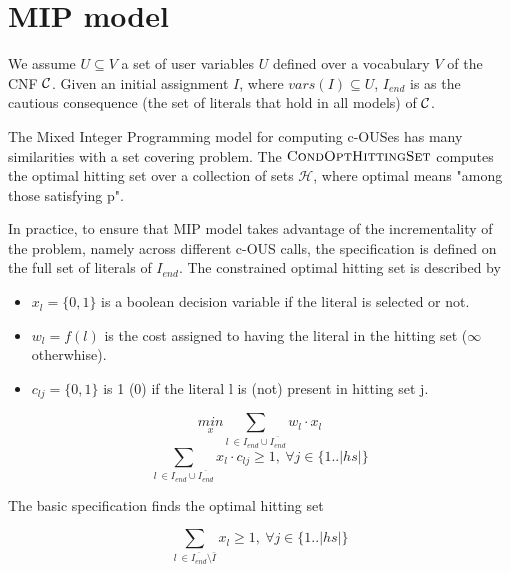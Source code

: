 \documentclass{article}
\newcommand\m[1]{\mathcal{#1}}
\newcommand\setstohit{\ensuremath{\m{H} }\xspace}
\newcommand\Iend{\ensuremath{I_\mathit{end} }\xspace}
\newcommand\mm[1]{\ensuremath{#1}\xspace}
\newcommand\call[1]{\mm{\textsc{#1}}}
\newcommand\cohs{\mm{\call{CondOptHittingSet}}}
\begin{document}
\section{MIP model}

We assume $U \subseteq V$ a set of user variables $U$ defined over a vocabulary $V$ of the CNF ${\cal C}$. Given an initial assignment $I$, where $vars(I) \subseteq U$, $I_{end}$ is as the cautious consequence (the set of literals that hold in all models) of ${\cal C}$.


The Mixed Integer Programming model for computing c-OUSes has many similarities with a set covering problem. The \cohs computes the optimal hitting set over a collection of sets $\setstohit$, where optimal means "among those satisfying p".

In practice, to ensure that MIP model takes advantage of the incrementality of the problem, namely across different c-OUS calls, the specification is defined on the full set of literals of $\Iend$.
The constrained optimal hitting set is described by
\begin{itemize}
  \item $x_l = \{0, 1\} $ is a boolean decision variable if the literal is selected or not.
  \item $w_l = f(l)$ is the cost assigned to having the literal in the hitting set ($\infty$ otherwhise).
  \item $c_{lj} = \{0, 1\}$ is 1 (0) if the literal l is (not) present in hitting set j.
\end{itemize}

\begin{equation} \label{eq:ILP:objective}
  \underset{x}{min} \sum_{ l\  \in  \Iend \cup \overline{\Iend}} w_l \cdot x_l
\end{equation}
\begin{equation} \label{eq:ILP:hittingset}
  \sum_{ l\  \in  \Iend \cup \overline{\Iend}} x_l \cdot c_{lj} \geq 1, \  \forall j \in \{1..|hs|\}
\end{equation}

The basic specification finds the optimal hitting set 


\begin{equation} \label{eq:ILP:hittingset}
  \sum_{ l\  \in \overline{\Iend} \setminus \bar{I}} x_l \geq 1, \  \forall j \in \{1..|hs|\}
\end{equation}
\end{document}
